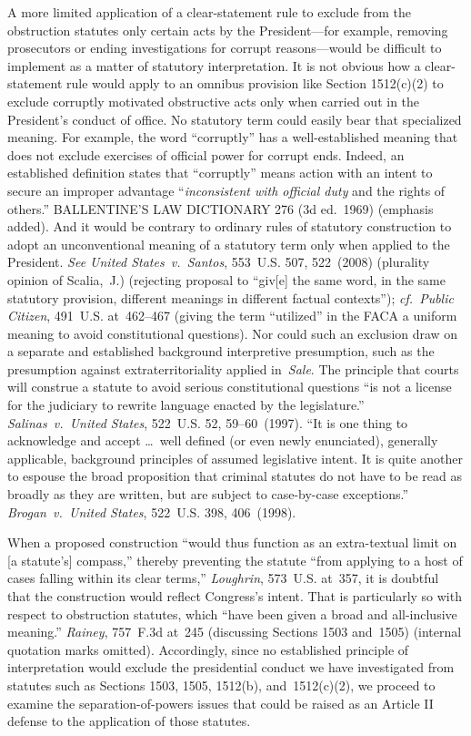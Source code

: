 A more limited application of a clear-statement rule to exclude from the obstruction statutes only certain acts by the President---for example, removing prosecutors or ending investigations for corrupt reasons---would be difficult to implement as a matter of statutory interpretation.
It is not obvious how a clear-statement rule would apply to an omnibus provision like Section 1512(c)(2) to exclude corruptly motivated obstructive acts only when carried out in the President's conduct of office.
No statutory term could easily bear that specialized meaning.
For example, the word ``corruptly'' has a well-established meaning that does not exclude exercises of official power for corrupt ends.
Indeed, an established definition states that ``corruptly'' means action with an intent to secure an improper advantage ``\textit{inconsistent with official duty} and the rights of others.''
BALLENTINE'S LAW DICTIONARY 276 (3d ed.~1969) (emphasis added).
And it would be contrary to ordinary rules of statutory construction to adopt an unconventional meaning of a statutory term only when applied to the President.
\textit{See United States~v.\ Santos}, 553~U.S. 507, 522~(2008) (plurality opinion of Scalia,~J.) (rejecting proposal to ``giv[e] the same word, in the same statutory provision, different meanings in different factual contexts'');
\textit{cf.~Public Citizen}, 491~U.S. at~462--467 (giving the term ``utilized'' in the FACA a uniform meaning to avoid constitutional questions).
Nor could such an exclusion draw on a separate and established background interpretive presumption, such as the presumption against extraterritoriality applied in~\textit{Sale}.
The principle that courts will construe a statute to avoid serious constitutional questions ``is not a license for the judiciary to rewrite language enacted by the legislature.''
\textit{Salinas~v.\ United States}, 522~U.S. 52, 59--60~(1997).
``It is one thing to acknowledge and accept \dots\ well defined (or even newly enunciated), generally applicable, background principles of assumed legislative intent.
It is quite another to espouse the broad proposition that criminal statutes do not have to be read as broadly as they are written, but are subject to case-by-case exceptions.''
\textit{Brogan~v.\ United States}, 522~U.S. 398, 406~(1998).

When a proposed construction ``would thus function as an extra-textual limit on [a statute's] compass,'' thereby preventing the statute ``from applying to a host of cases falling within its clear terms,'' \textit{Loughrin}, 573~U.S. at~357, it is doubtful that the construction would reflect Congress's intent.
That is particularly so with respect to obstruction statutes, which ``have been given a broad and all-inclusive meaning.''
\textit{Rainey}, 757~F.3d at~245 (discussing Sections 1503 and~1505) (internal quotation marks omitted).
Accordingly, since no established principle of interpretation would exclude the presidential conduct we have investigated from statutes such as Sections 1503, 1505, 1512(b), and~1512(c)(2), we proceed to examine the separation-of-powers issues that could be raised as an Article II defense to the application of those statutes.

